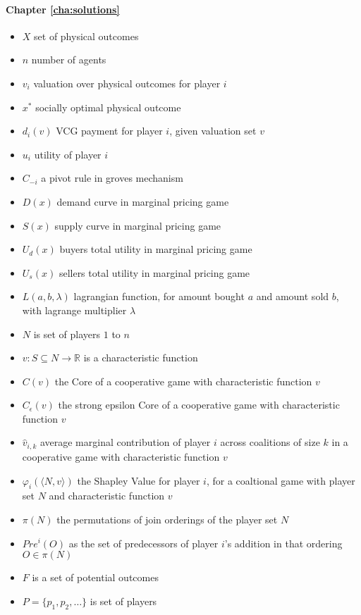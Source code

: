 \paragraph*{Chapter \ref{cha:solutions}}
\begin{itemize}
\item	$X$ set of physical outcomes
\item	$n$ number of agents
\item	$v_i$ valuation over physical outcomes for player $i$
\item	$x^*$ socially optimal physical outcome
\item	$d_i(v)$ VCG payment for player $i$, given valuation set $v$
\item	$u_i$ utility of player $i$
\item	$C_{-i}$ a pivot rule in groves mechanism
\item	$D(x)$ demand curve in marginal pricing game
\item	$S(x)$ supply curve in marginal pricing game
\item	$U_d(x)$ buyers total utility in marginal pricing game
\item	$U_s(x)$ sellers total utility in marginal pricing game
\item	$L(a,b,\lambda)$ lagrangian function, for amount bought $a$ and amount sold $b$, with lagrange multiplier $\lambda$
\item	$N$ is set of players $1$ to $n$
\item	$v: S\subseteq N \rightarrow \mathbb{R}$ is a characteristic function
\item	$C(v)$ the Core of a cooperative game with characteristic function $v$
\item	$C_\epsilon(v)$ the strong epsilon Core of a cooperative game with characteristic function $v$
\item	$\hat{v}_{i,k}$ average marginal contribution of player $i$ across coalitions of size $k$ in a cooperative game with characteristic function $v$
\item	$\varphi_i(\langle N,v\rangle)$ the Shapley Value for player $i$, for a coaltional game with player set $N$ and characteristic function $v$
\item	$\pi(N)$ the permutations of join orderings of the player set $N$
\item	$Pre^i(O)$ as the set of predecessors of player $i$'s addition in that ordering $O\in \pi(N)$
\item	$F$ is a set of potential outcomes
\item	$P=\{p_1,p_2,\dots\}$ is set of players

\end{itemize}
